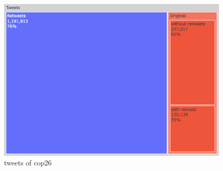 \begin{figure}
    \centering
    \includegraphics[width=0.9\linewidth]{Chapter3/figures/treemap_tweets-1.png}
    \caption{tweets of cop26}
    \label{fig:cop26_tweets_stats}
\end{figure}








\ifpdf
    \graphicspath{{Chapter3/Figs/Raster/}{Chapter3/Figs/PDF/}{Chapter3/Figs/}}
\else
    \graphicspath{{Chapter3/Figs/Vector/}{Chapter3/Figs/}}
\fi


